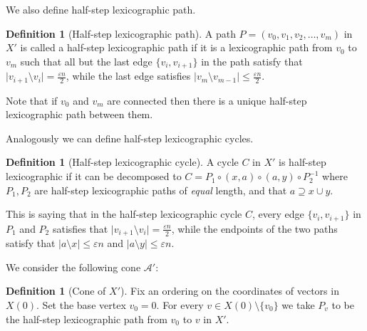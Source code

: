 \documentclass[10pt,a4paper]{article}
\theoremstyle{definition}
\newtheorem{definition}[theorem]{Definition}
\theoremstyle{remark}
\newcommand{\abs}[1]{\lvert#1\rvert}
\newcommand{\set}[1]{\{#1\}}
\renewcommand{\leq}{\leqslant}
\renewcommand{\le}{\leqslant}
\numberwithin{equation}{section}
\begin{document}
We also define half-step lexicographic path.
\begin{definition}[Half-step lexicographic path]
    A path \(P=(v_0,v_1,v_2,\dots,v_m)\) in $X'$ is called a half-step lexicographic path if it is a lexicographic path from $v_0$ to $v_m$ such that all but the last edge \(\set{v_i,v_{i+1}}\) in the path satisfy that \(\abs{v_{i+1} \setminus v_i} = \frac{\varepsilon n}{2}\), while the last edge satisfies \(\abs{v_{m} \setminus v_{m-1}} \le \frac{\varepsilon n}{2}\).  
\end{definition}
Note that if \(v_0\) and \(v_m\) are connected then there is a unique half-step lexicographic path between them.  

Analogously we can define half-step lexicographic cycles.
\begin{definition}[Half-step lexicographic cycle]
    A cycle \(C\) in $X'$ is half-step lexicographic if it can be decomposed to \(C = P_1 \circ (x,a) \circ (a,y) \circ P_2^{-1}\) where \(P_1,P_2\) are half-step lexicographic paths of \textit{equal} length, and that $a \supseteq x \cup y$.
\end{definition}
This is saying that in the half-step lexicographic cycle $C$, every edge $\{v_i,v_{i+1}\}$ in $P_1$ and $P_2$ satisfies that  \(\abs{v_{i+1} \setminus v_i} = \frac{\varepsilon n}{2}\), while the endpoints of the two paths satisfy that $\abs{a \setminus x} \le \varepsilon n$ and $\abs{a \setminus y} \le \varepsilon n$. 


We consider the following cone $\mathcal{A}'$: 
\begin{definition}[Cone of $X'$]\label{def:cone-X'}
    Fix an ordering on the coordinates of vectors in $X(0)$. Set the base vertex \(v_0 = 0\). For every \(v \in X(0) \setminus\{v_0\}\) we take \(P_v\) to be the half-step lexicographic path from $v_0$ to $v$ in $X'$.  
\end{definition}


\end{document}
